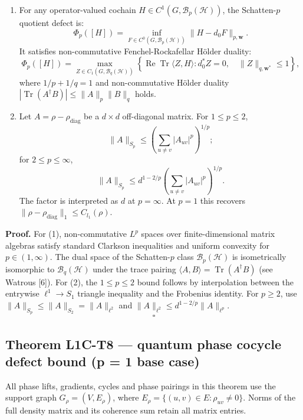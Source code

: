 \documentclass[
]{article}
\providecommand{\tightlist}{%
  \setlength{\itemsep}{0pt}\setlength{\parskip}{0pt}}
\providecommand{\tightlist}{%
  \setlength{\itemsep}{0pt}\setlength{\parskip}{0pt}}
\begin{document}
\begin{enumerate}
\def\labelenumi{\arabic{enumi}.}
\tightlist
\item
  For any operator-valued cochain \(H \in C^1(G, \mathcal{B}_p(\mathcal{H}))\), the Schatten-\(p\) quotient defect is:
  \[\Phi_p([H]) = \inf_{F \in C^0(G, \mathcal{B}_p(\mathcal{H}))} \|H - d_0 F\|_{p, \mathbf{w}}.\]
  It satisfies non-commutative Fenchel-Rockafellar Hölder duality:
  \[\Phi_p([H]) = \max_{Z \in C_1(G, \mathcal{B}_q(\mathcal{H}))} \left\{ \operatorname{Re}\operatorname{Tr}\langle Z, H \rangle : d_0^* Z = 0, \quad \|Z\|_{q, \mathbf{w}^*} \le 1 \right\},\]
  where \(1/p + 1/q = 1\) and non-commutative Hölder duality \(|\operatorname{Tr}(A^\dagger B)| \le \|A\|_p \|B\|_q\) holds.
\item
  Let \(A=\rho-\rho_{\mathrm{diag}}\) be a \(d\times d\) off-diagonal matrix. For \(1\le p\le2\),
  \[\|A\|_{S_p}\le \left(\sum_{u\ne v}|A_{uv}|^p\right)^{1/p};\]
  for \(2\le p\le\infty\),
  \[\|A\|_{S_p}\le d^{1-2/p}\left(\sum_{u\ne v}|A_{uv}|^p\right)^{1/p}.\]
  The factor is interpreted as \(d\) at \(p=\infty\). At \(p=1\) this recovers \(\|\rho-\rho_{\mathrm{diag}}\|_1\le C_{l_1}(\rho)\).
\end{enumerate}

\textbf{Proof.} For (1), non-commutative \(L^p\) spaces over finite-dimensional matrix algebras satisfy standard Clarkson inequalities and uniform convexity for \(p \in (1, \infty)\).
The dual space of the Schatten-\(p\) class \(\mathcal{B}_p(\mathcal{H})\) is isometrically isomorphic to \(\mathcal{B}_q(\mathcal{H})\) under the trace pairing \(\langle A, B \rangle = \operatorname{Tr}(A^\dagger B)\) (see Watrous {[}6{]}).
For (2), the \(1\le p\le2\) bound follows by interpolation between the entrywise \(\ell^1\to S_1\) triangle inequality and the Frobenius identity. For \(p\ge2\), use \(\|A\|_{S_p}\le\|A\|_{S_2}=\|A\|_{\ell^2}\) and \(\|A\|_{\ell^2}\le d^{1-2/p}\|A\|_{\ell^p}\). \[\square\]

\subsection{Theorem L1C-T8 --- quantum phase cocycle defect bound (p = 1 base case)}\label{theorem-l1c-t8-quantum-phase-cocycle-defect-bound-p-1-base-case}

All phase lifts, gradients, cycles and phase pairings in this theorem use the support graph \(G_\rho=(V,E_\rho)\), where \(E_\rho=\{(u,v)\in E:\rho_{uv}\ne0\}\). Norms of the full density matrix and its coherence sum retain all matrix entries.
\end{document}
